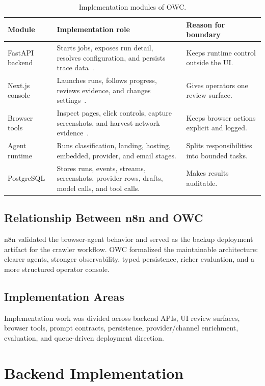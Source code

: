 \begin{table}[!htbp]
\centering
\begin{tabularx}{\textwidth}{Q{3.0cm} Y Y}
\toprule
{}
Module & Implementation role & Reason for boundary \\
\midrule
FastAPI backend & Starts jobs, exposes run detail, resolves configuration, and
persists trace data~\cite{fastapi}. & Keeps runtime control outside the UI. \\
Next.js console & Launches runs, follows progress, reviews evidence, and
changes settings~\cite{nextjs}. & Gives operators one review surface. \\
Browser tools & Inspect pages, click controls, capture screenshots, and
harvest network evidence~\cite{mcp-spec,puppeteer}. & Keeps browser actions
explicit and logged. \\
Agent runtime & Runs classification, landing, hosting, embedded, provider, and
email stages. & Splits responsibilities into bounded tasks. \\
PostgreSQL & Stores runs, events, streams, screenshots, provider rows, drafts,
model calls, and tool calls. & Makes results auditable. \\
\bottomrule
\end{tabularx}
\caption{Implementation modules of OWC.}
\label{tab:implementation-areas}
\end{table}

\subsection{Relationship Between n8n and OWC}

n8n validated the browser-agent behavior and served as the backup deployment
artifact for the crawler workflow. OWC formalized the maintainable architecture:
clearer agents, stronger observability, typed persistence, richer evaluation,
and a more structured operator console.

\subsection{Implementation Areas}

Implementation work was divided across backend APIs, UI review surfaces,
browser tools, prompt contracts, persistence, provider/channel enrichment,
evaluation, and queue-driven deployment direction.

\section{Backend Implementation}

